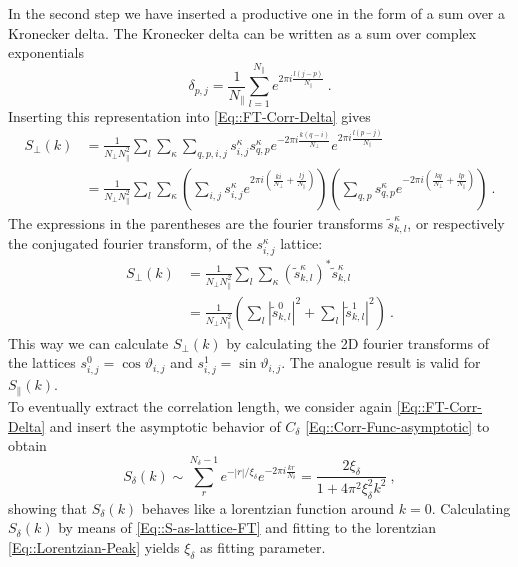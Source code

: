 	In the second step we have inserted a productive one in the form of  a sum over a Kronecker delta. The Kronecker delta can be written as a sum over complex exponentials
	\begin{equation}
		\delta_{p,j} =	\frac{1}{N_\parallel} \sum_{l=1}^{N_\parallel} e^{2 \pi i \frac{l(j - p)}{N_\parallel}}~.
	\end{equation}
	Inserting this representation into \autoref{Eq::FT-Corr-Delta} gives
	\begin{equation}
		\begin{split}
			S_\perp(k) &=	\frac{1}{N_\perp N_\parallel^2} \sum_l \sum_\kappa \sum_{q,p,i,j} s^\kappa_{i,j} s_{q, p}^\kappa e^{-2\pi i \frac{k(q-i)}{N_\perp}} e^{2 \pi i \frac{l(p - j)}{N_\parallel}} \\
			&=	\frac{1}{N_\perp N_\parallel^2} \sum_l \sum_\kappa \left(\sum_{i,j} s^\kappa_{i,j} e^{2\pi i \left(\frac{ki}{N_\perp} + \frac{lj}{N_\parallel} \right)} \right) \left(\sum_{q,p} s_{q, p}^\kappa e^{-2 \pi i \left( \frac{kq}{N_\perp} + \frac{lp}{N_\parallel} \right)} \right)~.
		\end{split}
	\end{equation}
	The expressions in the parentheses are the fourier transforms $\tilde{s}_{k,l}^\kappa$, or respectively the conjugated fourier transform, of the $s_{i,j}^\kappa$ lattice:
	\begin{equation} \label{Eq::S-as-lattice-FT}
		\begin{split}
			S_\perp(k) &=	\frac{1}{N_\perp N_\parallel^2} \sum_l \sum_\kappa \left(\tilde{s}_{k,l}^\kappa\right)^* \tilde{s}_{k,l}^\kappa \\
			&= \frac{1}{N_\perp N_\parallel^2} \left( \sum_l |\tilde{s}_{k,l}^0|^2  + \sum_l |\tilde{s}_{k,l}^1|^2\right)~.
		\end{split}
	\end{equation}
	This way we can calculate $S_\perp(k)$ by calculating the 2D fourier transforms of the lattices $s_{i,j}^0 = \cos \vartheta_{i,j}	$ and $s_{i,j}^1 =	\sin \vartheta_{i,j}$.
	The analogue result is valid for $S_\parallel(k)$. \\
	
	To eventually extract the correlation length, we consider again \autoref{Eq::FT-Corr-Delta} and insert the asymptotic behavior of $C_\delta$  \autoref{Eq::Corr-Func-asymptotic} to obtain
	\begin{equation} \label{Eq::Lorentzian-Peak}
		S_\delta(k) \sim \sum_r^{N_\delta - 1} e^{-|r| /	\xi_\delta} e^{-2\pi i \frac{kr}{N_\delta}} = \frac{2 \xi_\delta}{1 + 4 \pi^2 \xi_\delta^2 k^2}	~,	
	\end{equation}
	showing that $S_\delta(k)$ behaves like a lorentzian function around $k=0$. Calculating $S_\delta(k)$ by means of \autoref{Eq::S-as-lattice-FT} and fitting to the lorentzian \autoref{Eq::Lorentzian-Peak} yields $\xi_\delta$ as fitting parameter.
	
